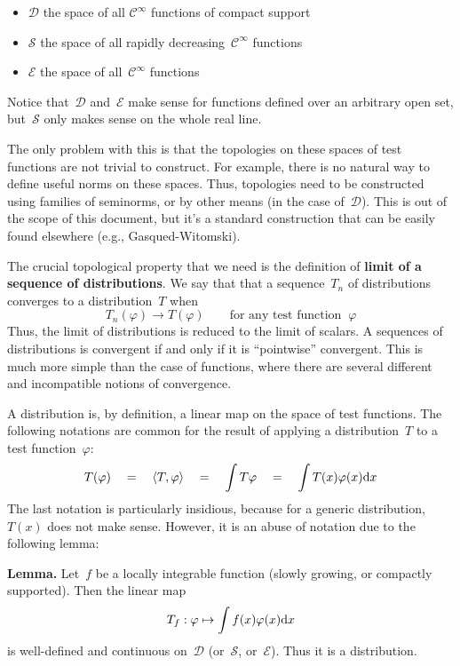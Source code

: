 \begin{itemize}
	\item $\mathcal{D}$ the space of all $\mathcal{C}^\infty$
		functions of compact support
	\item $\mathcal{S}$ the space of all rapidly
		decreasing~$\mathcal{C}^\infty$ functions
	\item $\mathcal{E}$ the space of all~$\mathcal{C}^\infty$
		functions
\end{itemize}

Notice that~$\mathcal{D}$ and~$\mathcal{E}$ make sense for functions
defined over an arbitrary open set, but~$\mathcal{S}$ only makes
sense on the whole real line.

The only problem with this is that the topologies on these spaces of
test functions are not trivial to construct.  For example, there is
no natural way to define useful norms on these spaces.  Thus,
topologies need to be constructed using families of seminorms, or by
other means (in the case of~$\mathcal{D}$).  This is out of the scope
of this document, but it's a standard construction that can be easily
found elsewhere (e.g., Gasqued-Witomski).

The crucial topological property that we need is the definition of
{\bf limit of a sequence of distributions}.  We say that that a
sequence~$T_n$ of distributions converges to a distribution~$T$ when
$$
T_n(\varphi)\to T(\varphi)\qquad\textrm{for any test function }\ \varphi
$$
Thus, the limit of distributions is reduced to the limit of scalars.
A sequences of distributions is convergent if and only if it is
``pointwise'' convergent.  This is much more simple than the case of
functions, where there are several different and incompatible notions
of convergence.

A distribution is, by definition, a linear map on the space of test
functions.  The following notations are common for the result of
applying a distribution~$T$ to a test function~$\varphi$:
$$
T(\varphi)
\quad=\quad
\left<T,\varphi\right>
\quad=\quad
\int T\varphi
\quad=\quad
\int T(x)\varphi(x)\mathrm{d} x
$$
The last notation is particularly insidious, because for a generic
distribution,~$T(x)$ does not make sense.  However, it is an abuse of
notation due to the following lemma:

{\bf Lemma.}  Let~$f$ be a locally integrable function (slowly
growing, or compactly supported).  Then the linear map
$$
T_f : \varphi\mapsto\int f(x)\varphi(x)\mathrm{d} x
$$
is well-defined and continuous on~$\mathcal{D}$ (or~$\mathcal{S}$,
or~$\mathcal{E}$).  Thus it is a distribution.

